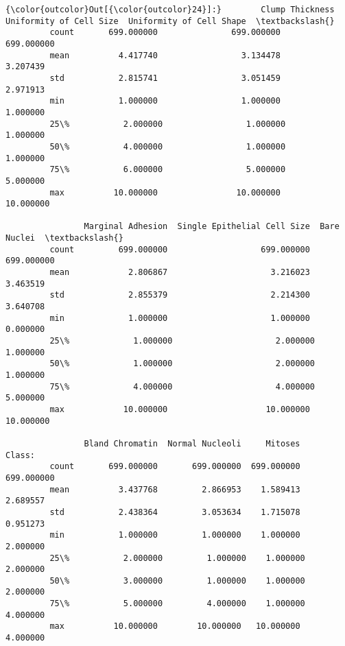 \documentclass[11pt]{article}
\begin{document}
\begin{Verbatim}[commandchars=\\\{\}]
{\color{outcolor}Out[{\color{outcolor}24}]:}        Clump Thickness  Uniformity of Cell Size  Uniformity of Cell Shape  \textbackslash{}
         count       699.000000               699.000000                699.000000   
         mean          4.417740                 3.134478                  3.207439   
         std           2.815741                 3.051459                  2.971913   
         min           1.000000                 1.000000                  1.000000   
         25\%           2.000000                 1.000000                  1.000000   
         50\%           4.000000                 1.000000                  1.000000   
         75\%           6.000000                 5.000000                  5.000000   
         max          10.000000                10.000000                 10.000000   
         
                Marginal Adhesion  Single Epithelial Cell Size  Bare Nuclei  \textbackslash{}
         count         699.000000                   699.000000   699.000000   
         mean            2.806867                     3.216023     3.463519   
         std             2.855379                     2.214300     3.640708   
         min             1.000000                     1.000000     0.000000   
         25\%             1.000000                     2.000000     1.000000   
         50\%             1.000000                     2.000000     1.000000   
         75\%             4.000000                     4.000000     5.000000   
         max            10.000000                    10.000000    10.000000   
         
                Bland Chromatin  Normal Nucleoli     Mitoses      Class:  
         count       699.000000       699.000000  699.000000  699.000000  
         mean          3.437768         2.866953    1.589413    2.689557  
         std           2.438364         3.053634    1.715078    0.951273  
         min           1.000000         1.000000    1.000000    2.000000  
         25\%           2.000000         1.000000    1.000000    2.000000  
         50\%           3.000000         1.000000    1.000000    2.000000  
         75\%           5.000000         4.000000    1.000000    4.000000  
         max          10.000000        10.000000   10.000000    4.000000  
\end{Verbatim}
            
\end{document}
